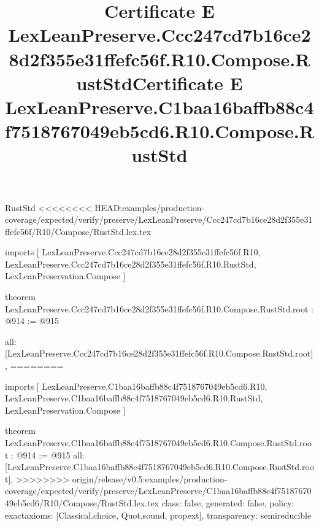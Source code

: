\begin{lexlean}{RustStd}
<<<<<<<< HEAD:examples/production-coverage/expected/verify/preserve/LexLeanPreserve/Ccc247cd7b16ce28d2f355e31ffefc56f/R10/Compose/RustStd.lex.tex
\title{Certificate E LexLeanPreserve.Ccc247cd7b16ce28d2f355e31ffefc56f.R10.Compose.RustStd}
\begin{coremodule}
imports [
  LexLeanPreserve.Ccc247cd7b16ce28d2f355e31ffefc56f.R10,
  LexLeanPreserve.Ccc247cd7b16ce28d2f355e31ffefc56f.R10.RustStd,
  LexLeanPreservation.Compose
]

theorem LexLeanPreserve.Ccc247cd7b16ce28d2f355e31ffefc56f.R10.Compose.RustStd.root : @914 := @915 {
  all: [LexLeanPreserve.Ccc247cd7b16ce28d2f355e31ffefc56f.R10.Compose.RustStd.root],
========
\title{Certificate E LexLeanPreserve.C1baa16baffb88c4f7518767049eb5cd6.R10.Compose.RustStd}
\begin{coremodule}
imports [
  LexLeanPreserve.C1baa16baffb88c4f7518767049eb5cd6.R10,
  LexLeanPreserve.C1baa16baffb88c4f7518767049eb5cd6.R10.RustStd,
  LexLeanPreservation.Compose
]

theorem LexLeanPreserve.C1baa16baffb88c4f7518767049eb5cd6.R10.Compose.RustStd.root : @914 := @915 {
  all: [LexLeanPreserve.C1baa16baffb88c4f7518767049eb5cd6.R10.Compose.RustStd.root],
>>>>>>>> origin/release/v0.5:examples/production-coverage/expected/verify/preserve/LexLeanPreserve/C1baa16baffb88c4f7518767049eb5cd6/R10/Compose/RustStd.lex.tex
  class: false,
  generated: false,
  policy: exact{axioms: [Classical.choice, Quot.sound, propext]},
  transparency: semireducible
}


\end{coremodule}}
\end{coremodule}
\end{lexlean}
